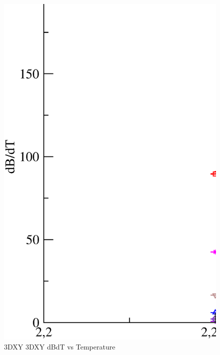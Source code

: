 \begin{figure}[!htpb]
  \centering
  \includegraphics[width=\textwidth]{./plots/3DXY/3DXY_dBdT_vs_Temperature.eps}
  \caption{3DXY 3DXY dBdT vs Temperature}
\end{figure}

